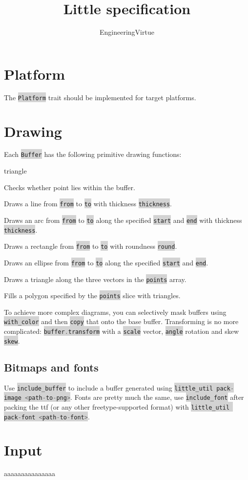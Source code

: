 \documentclass[14pt]{article}
\title{Little specification}
\author{EngineeringVirtue}
\newcommand{\inlinecodelang}[2]{\colorbox{lightgray}{\lstinline[language=#1]$#2$}}
\newcommand{\inliners}[1]{\inlinecodelang{Rust}{#1}}
\begin{document}
\maketitle

\tableofcontents

\newpage

\section{Platform}

The \inliners{Platform} trait should be implemented for target platforms.

\section{Drawing}

Each \inliners{Buffer} has the following primitive drawing functions:

\begin{labeling}{triangle}
    \item[bounded] Checks whether point lies within the buffer.
    \item[line] Draws a line from \inliners{from} to \inliners{to} with thickness \inliners{thickness}.
    \item[arc] Draws an arc from \inliners{from} to \inliners{to} along the specified \inliners{start} and \inliners{end} with thickness \inliners {thickness}.
    \item[rect] Draws a rectangle from \inliners{from} to \inliners{to} with roundness \inliners{round}.
    \item[ellipse] Draws an ellipse from \inliners{from} to \inliners{to} along the specified \inliners{start} and \inliners{end}.
    \item[triangle] Draws a triangle along the three vectors in the \inliners{points} array.
    \item[poly] Fills a polygon specified by the \inliners{points} slice with triangles.
\end{labeling}

To achieve more complex diagrams, you can selectively mask buffers using \inliners{with_color} and then \inliners{copy} that onto the base buffer. Transforming is no more complicated: \inliners{buffer.transform} with a \inliners{scale} vector, \inliners{angle} rotation and skew \inliners{skew}.

\subsection{Bitmaps and fonts}

Use \inliners{include_buffer} to include a buffer generated using \inliners{little_util pack-image <path-to-png>}. Fonts are pretty much the same, use \inliners{include_font} after packing the ttf (or any other freetype-supported format) with \inliners{little_util pack-font <path-to-font>}.

\section{Input}

aaaaaaaaaaaaaaa
\end{document}
